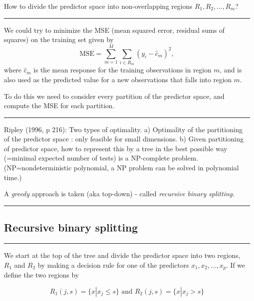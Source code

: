 \documentclass[
  letterpaper,
  DIV=11,
  numbers=noendperiod]{scrartcl}
\begin{document}
How to divide the predictor space into non-overlapping regions
\(R_1,R_2,\ldots,R_m\)?

\begin{center}\rule{0.5\linewidth}{0.5pt}\end{center}

We could try to minimize the MSE (mean squared error, residual sums of
squares) on the training set given by \[
\text{MSE}=\sum_{m=1}^M \sum_{i \in R_m}(y_i-\hat{c}_m)^2,
\] where \(\hat{c}_m\) is the mean response for the training
observations in region \(m\), and is also used as the predicted value
for a new observations that falls into region \(m\).

To do this we need to consider every partition of the predictor space,
and compute the MSE for each partition.

\begin{center}\rule{0.5\linewidth}{0.5pt}\end{center}

Ripley (1996, p 216): Two types of optimality. a) Optimality of the
partitioning of the predictor space : only feasible for small
dimensions. b) Given partitioning of predictor space, how to represent
this by a tree in the best possible way (=minimal expected number of
tests) is a NP-complete problem. (NP=nondeterministic polynomial, a NP
problem can be solved in polynomial time.)

A \emph{greedy} approach is taken (aka top-down) - called
\emph{recursive binary splitting.}

\begin{center}\rule{0.5\linewidth}{0.5pt}\end{center}

\hypertarget{recursive-binary-splitting}{%
\subsection{Recursive binary
splitting}\label{recursive-binary-splitting}}

\begin{center}\rule{0.5\linewidth}{0.5pt}\end{center}

We start at the top of the tree and divide the predictor space into two
regions, \(R_1\) and \(R_2\) by making a decision rule for one of the
predictors \(x_1, x_2,...,x_p\). If we define the two regions by

\[R_1(j,s)=\{x|x_j\le s\} \text{ and }  R_2(j,s)=\{x|x_j > s\}\]
\end{document}

